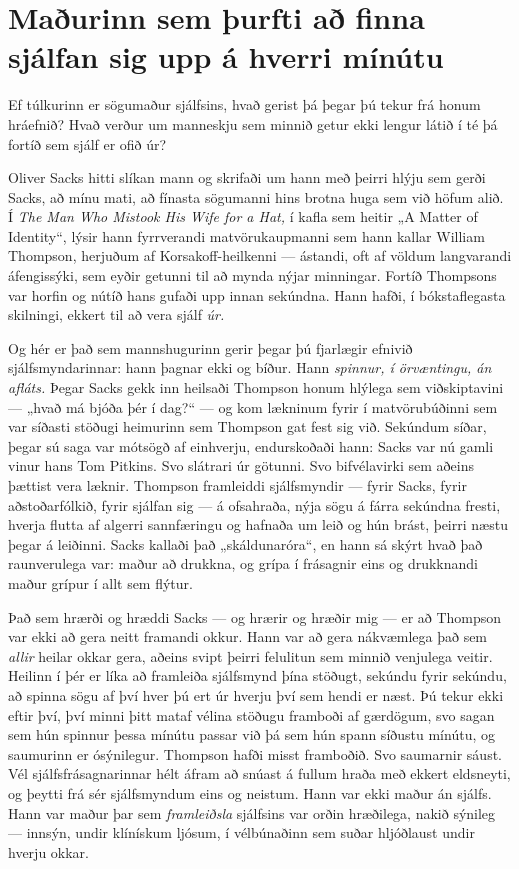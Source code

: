 \section*{Maðurinn sem þurfti að finna sjálfan sig upp á hverri mínútu}

Ef túlkurinn er sögumaður sjálfsins, hvað gerist þá þegar þú tekur frá honum hráefnið? Hvað verður um manneskju sem minnið getur ekki lengur látið í té þá fortíð sem sjálf er ofið úr?

Oliver Sacks hitti slíkan mann og skrifaði um hann með þeirri hlýju sem gerði Sacks, að mínu mati, að fínasta sögumanni hins brotna huga sem við höfum alið. Í \emph{The Man Who Mistook His Wife for a Hat,} í kafla sem heitir „A Matter of Identity“, lýsir hann fyrrverandi matvörukaupmanni sem hann kallar William Thompson, herjuðum af Korsakoff-heilkenni — ástandi, oft af völdum langvarandi áfengissýki, sem eyðir getunni til að mynda nýjar minningar. Fortíð Thompsons var horfin og nútíð hans gufaði upp innan sekúndna. Hann hafði, í bókstaflegasta skilningi, ekkert til að vera sjálf \emph{úr.}

Og hér er það sem mannshugurinn gerir þegar þú fjarlægir efnivið sjálfsmyndarinnar: hann þagnar ekki og bíður. Hann \emph{spinnur, í örvæntingu, án afláts.} Þegar Sacks gekk inn heilsaði Thompson honum hlýlega sem viðskiptavini — „hvað má bjóða þér í dag?“ — og kom lækninum fyrir í matvörubúðinni sem var síðasti stöðugi heimurinn sem Thompson gat fest sig við. Sekúndum síðar, þegar sú saga var mótsögð af einhverju, endurskoðaði hann: Sacks var nú gamli vinur hans Tom Pitkins. Svo slátrari úr götunni. Svo bifvélavirki sem aðeins þættist vera læknir. Thompson framleiddi sjálfsmyndir — fyrir Sacks, fyrir aðstoðarfólkið, fyrir sjálfan sig — á ofsahraða, nýja sögu á fárra sekúndna fresti, hverja flutta af algerri sannfæringu og hafnaða um leið og hún brást, þeirri næstu þegar á leiðinni. Sacks kallaði það „skáldunaróra“, en hann sá skýrt hvað það raunverulega var: maður að drukkna, og grípa í frásagnir eins og drukknandi maður grípur í allt sem flýtur.

Það sem hrærði og hræddi Sacks — og hrærir og hræðir mig — er að Thompson var ekki að gera neitt framandi okkur. Hann var að gera nákvæmlega það sem \emph{allir} heilar okkar gera, aðeins svipt þeirri felulitun sem minnið venjulega veitir. Heilinn í þér er líka að framleiða sjálfsmynd þína stöðugt, sekúndu fyrir sekúndu, að spinna sögu af því hver þú ert úr hverju því sem hendi er næst. Þú tekur ekki eftir því, því minni þitt mataf vélina stöðugu framboði af gærdögum, svo sagan sem hún spinnur þessa mínútu passar við þá sem hún spann síðustu mínútu, og saumurinn er ósýnilegur. Thompson hafði misst framboðið. Svo saumarnir sáust. Vél sjálfsfrásagnarinnar hélt áfram að snúast á fullum hraða með ekkert eldsneyti, og þeytti frá sér sjálfsmyndum eins og neistum. Hann var ekki maður án sjálfs. Hann var maður þar sem \emph{framleiðsla} sjálfsins var orðin hræðilega, nakið sýnileg — innsýn, undir klínískum ljósum, í vélbúnaðinn sem suðar hljóðlaust undir hverju okkar.

